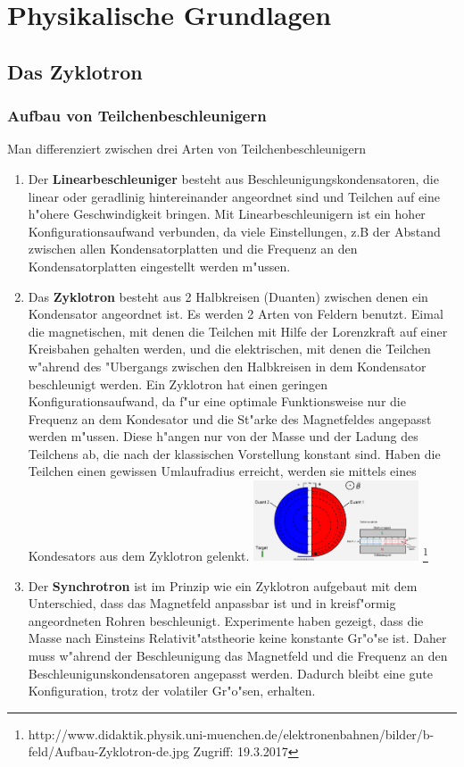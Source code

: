 \documentclass[14pt, a4paper]{report}
\begin{document}
\part{Physikalische Grundlagen}
\chapter{Das Zyklotron}
\section{Aufbau von Teilchenbeschleunigern}
Man differenziert zwischen drei Arten von Teilchenbeschleunigern \footnotemark
{}
\begin{enumerate}
\item
Der \textbf{Linearbeschleuniger} besteht aus Beschleunigungskondensatoren, die linear
oder geradlinig hintereinander angeordnet sind und Teilchen auf 
eine h"ohere Geschwindigkeit bringen. Mit Linearbeschleunigern ist ein hoher
Konfigurationsaufwand verbunden, da viele Einstellungen, z.B der Abstand zwischen allen
Kondensatorplatten und die Frequenz an den Kondensatorplatten eingestellt werden m"ussen.
\item \label{ZyklotronBeschreibungAufbau}
Das \textbf{Zyklotron} besteht aus 2 Halbkreisen (Duanten) zwischen denen ein Kondensator 
angeordnet ist. Es werden 2 Arten von Feldern benutzt. Eimal die magnetischen, mit 
denen die 
Teilchen mit Hilfe der Lorenzkraft auf einer Kreisbahen
gehalten werden, und die elektrischen, 
mit denen die Teilchen w"ahrend des "Ubergangs zwischen den Halbkreisen in dem 
Kondensator beschleunigt werden. Ein Zyklotron hat einen geringen 
Konfigurationsaufwand, da f"ur eine optimale Funktionsweise nur die Frequenz an dem 
Kondesator und die St"arke des Magnetfeldes angepasst werden m"ussen. Diese h"angen nur von der 
Masse und der Ladung des Teilchens ab, die nach der klassischen Vorstellung konstant
sind. Haben die Teilchen einen gewissen Umlaufradius erreicht, werden sie mittels eines 
Kondesators aus dem Zyklotron gelenkt.
\includegraphics[height=90px]{doc/Aufbau-Zyklotron-de.jpg}
\footnote{http://www.didaktik.physik.uni-muenchen.de/elektronenbahnen/bilder/b-feld/Aufbau-Zyklotron-de.jpg Zugriff: 19.3.2017}

\item
Der \textbf{Synchrotron} ist im Prinzip wie ein Zyklotron aufgebaut mit dem 
Unterschied, dass das Magnetfeld anpassbar ist und in kreisf"ormig angeordneten Rohren 
beschleunigt. Experimente haben gezeigt, dass die
Masse nach Einsteins Relativit"atstheorie keine konstante Gr"o"se ist. Daher muss 
w"ahrend der Beschleunigung das Magnetfeld und die Frequenz an den 
Beschleunigunskondensatoren angepasst werden. Dadurch bleibt eine gute Konfiguration, 
trotz der volatiler Gr"o"sen, erhalten. \label{synchrotron}
\end{enumerate}
\end{document}
